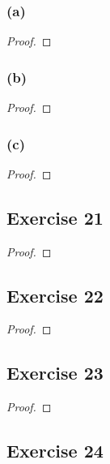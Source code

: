 \documentclass[14pt]{extarticle}
\begin{document}
\subsubsection{(a)}

\begin{proof}

\end{proof}

\subsubsection{(b)}

\begin{proof}

\end{proof}

\subsubsection{(c)}

\begin{proof}

\end{proof}

\subsection{Exercise 21}

\begin{proof}

\end{proof}

\subsection{Exercise 22}

\begin{proof}

\end{proof}

\subsection{Exercise 23}

\begin{proof}

\end{proof}

\subsection{Exercise 24}
\end{document}

